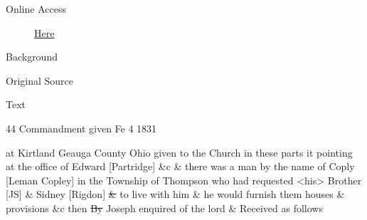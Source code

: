 			\begin{description}
				\item[Online Access] \href{https://www.josephsmithpapers.org/paper-summary/revelation-4-february-1831-dc-41/1}{Here}
			\end{description}
			
			\begin{description}
				\item[Background]
			\end{description}
			
			
			\begin{description}
				\item[Original Source]
			\end{description}
			
			
			\begin{description}
				\item[Text]
			\end{description}
			
				\begin{tightcenter}
				44 Commandment given Fe 4 1831
				\end{tightcenter}
				
				at Kirtland Geauga County Ohio given to the Church in these parts it pointing at the office of Edward [Partridge] \&c \& there was a man by the name of Coply [Leman Copley] in the Township of Thompson who had requested <his> Brother [JS] \& Sidney [Rigdon] \sout{\&} to live with him \& he would furnish them houses \& provisions \&c then \sout{By} Joseph enquired of the lord \& Received as follows
				
